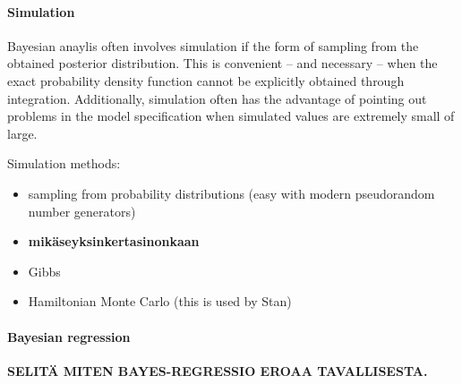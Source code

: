 \paragraph{Simulation}\label{simulation}

Bayesian anaylis often involves simulation if the form of sampling from the
obtained posterior distribution. This is convenient -- and necessary -- when
the exact probability density function cannot be explicitly obtained through
integration. Additionally, simulation often has the advantage of pointing out
problems in the model specification when simulated values are extremely small
of large.

Simulation methods:
\begin{itemize}
  \item
  sampling from probability distributions (easy with modern pseudorandom
  number generators)
  \item
  \textbf{mikäseyksinkertasinonkaan}
  \item
  Gibbs
  \item
  Hamiltonian Monte Carlo (this is used by Stan)
\end{itemize}


\paragraph{Bayesian regression}\label{bayesian-regression}

\textbf{SELITÄ MITEN BAYES-REGRESSIO EROAA TAVALLISESTA.}
